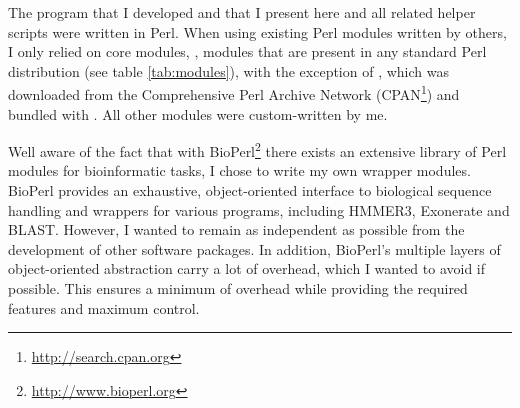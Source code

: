 The program \pname that I developed and that I present here and all related
helper scripts were written in Perl. When using existing Perl modules written
by others, I only relied on core modules, \ie, modules that are present in any
standard Perl distribution (see table \ref{tab:modules}), with the exception of
 \citep{shan2001}, which was downloaded from the Comprehensive
Perl Archive Network (CPAN\footnote{\url{http://search.cpan.org}}) and bundled
with \pname. All other modules were custom-written by me.



Well aware of the fact that with BioPerl\footnote{\url{http://www.bioperl.org}}
there exists an extensive library of Perl modules for bioinformatic tasks, I
chose to write my own wrapper modules. BioPerl provides an exhaustive,
object-oriented interface to biological sequence handling and wrappers for
various programs, including HMMER3, Exonerate and BLAST. However, I wanted
\pname to remain as independent as possible from the development of other
software packages. In addition, BioPerl's multiple layers of object-oriented
abstraction carry a lot of overhead, which I wanted to avoid if possible. This
ensures a minimum of overhead while providing the required features and maximum
control.
